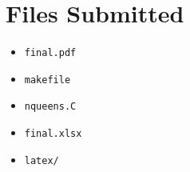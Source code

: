 \documentclass{article}
\begin{document}
\section{Files Submitted}
\begin{itemize}
    \item \texttt{final.pdf}
    \item \texttt{makefile}
    \item \texttt{nqueens.C}
    \item \texttt{final.xlsx}
    \item \texttt{latex/}
\end{itemize}
\end{document}
